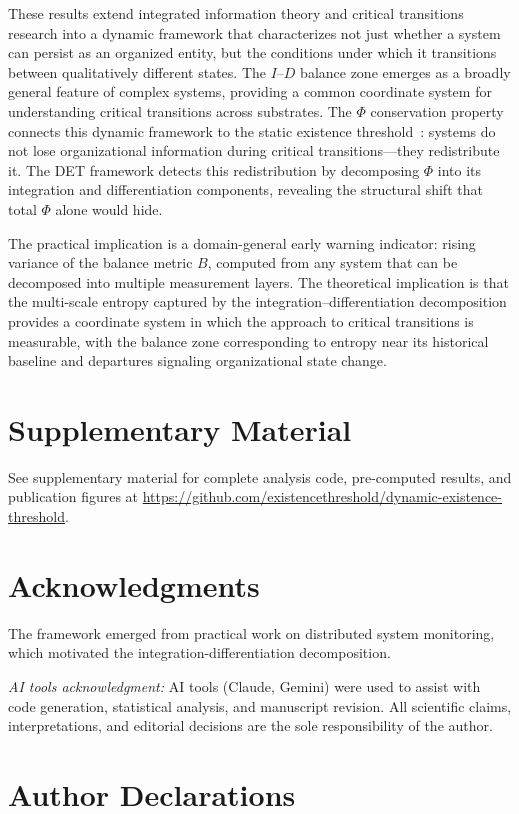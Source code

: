 \documentclass[aip,cha,reprint,amsmath,amssymb,final,floatfix]{revtex4-2}
\begin{document}
These results extend integrated information theory and critical transitions research into a dynamic framework that characterizes not just whether a system can persist as an organized entity, but the conditions under which it transitions between qualitatively different states. The $I$--$D$ balance zone emerges as a broadly general feature of complex systems, providing a common coordinate system for understanding critical transitions across substrates. The $\Phi$ conservation property connects this dynamic framework to the static existence threshold~\cite{thornhill2026a}: systems do not lose organizational information during critical transitions---they redistribute it. The DET framework detects this redistribution by decomposing $\Phi$ into its integration and differentiation components, revealing the structural shift that total $\Phi$ alone would hide.

The practical implication is a domain-general early warning indicator: rising variance of the balance metric $B$, computed from any system that can be decomposed into multiple measurement layers. The theoretical implication is that the multi-scale entropy captured by the integration--differentiation decomposition provides a coordinate system in which the approach to critical transitions is measurable, with the balance zone corresponding to entropy near its historical baseline and departures signaling organizational state change.


\section*{Supplementary Material}

See supplementary material for complete analysis code, pre-computed results, and publication figures at \url{https://github.com/existencethreshold/dynamic-existence-threshold}.

\section*{Acknowledgments}
The framework emerged from practical work on distributed system monitoring, which motivated the integration-differentiation decomposition.

\emph{AI tools acknowledgment:} AI tools (Claude, Gemini) were used to assist with code generation, statistical analysis, and manuscript revision. All scientific claims, interpretations, and editorial decisions are the sole responsibility of the author.

\section*{Author Declarations}
\end{document}
